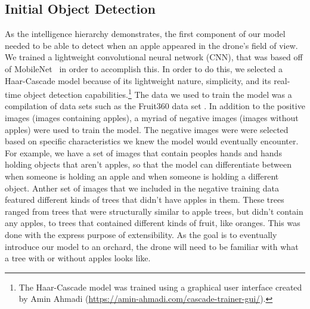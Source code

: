 \subsection{Initial Object Detection}
As the intelligence hierarchy demonstrates, the first component of our model needed to be able to detect when an apple appeared in the drone's field of view. 
We trained a lightweight convolutional neural network (CNN), that was based off of MobileNet~\cite{Sandler2018,PyTorchMobileNet} in order to accomplish this. 
In order to do this, we selected a Haar-Cascade model because of its lightweight nature, simplicity, and its real-time object detection capabilities.\footnote{The Haar-Cascade model was trained using a graphical user interface created by Amin Ahmadi (\url{https://amin-ahmadi.com/cascade-trainer-gui/}).} 
The data we used to train the model was a compilation of data sets such as the Fruit360 data set \cite{Fruit360}.
In addition to the positive images (images containing apples), a myriad of negative images (images without apples) were used to train the model.
The negative images were were selected based on specific characteristics we knew the model would eventually encounter. 
For example, we have a set of images that contain peoples hands and hands holding objects that aren't apples, so that the model can differentiate between when someone is holding an apple and when someone is holding a different object.
Anther set of images that we included in the negative training data featured different kinds of trees that didn't have apples in them.
These trees ranged from trees that were structurally similar to apple trees, but didn't contain any apples, to trees that contained different kinds of fruit, like oranges.
This was done with the express purpose of extensibility.
As the goal is to eventually introduce our model to an orchard, the drone will need to be familiar with what a tree with or without apples looks like.